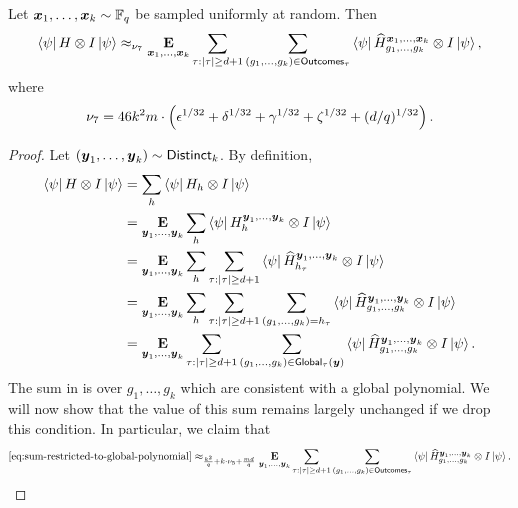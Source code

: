 \begin{lemma}
\label{lem:over-all-outcomes}
Let ${\boldsymbol{x}}_1, \ldots, {\boldsymbol{x}}_k \sim \mathbb F_q$ be sampled uniformly at random.
Then
\begin{equation*}
\bra{\psi} H \otimes I \ket{\psi}
\approx_{\nu_7}  \mathop{\bf E\/}_{{\boldsymbol{x}}_1, \ldots, {\boldsymbol{x}}_k} \sum_{\tau:|\tau| \geq d+1} \sum_{(g_1, \ldots, g_k) \in \mathsf{Outcomes}_{\tau}} \bra{\psi} \widehat{H}^{{\boldsymbol{x}}_1, \ldots, {\boldsymbol{x}}_k}_{g_1, \ldots, g_k} \otimes I \ket{\psi},
\end{equation*}
where
\begin{equation*}
\nu_7 = 46 k^2m \cdot \left(\epsilon^{1/32} + \delta^{1/32} +\gamma^{1/32} +  \zeta^{1/32} + (d/q)^{1/32}\right).
\end{equation*}
\end{lemma}
\begin{proof}
Let $(\boldsymbol{y}_1, \ldots, \boldsymbol{y}_k) \sim \mathsf{Distinct}_k$.
By definition,
\begin{align}
\bra{\psi} H \otimes I \ket{\psi}
&= \sum_h \bra{\psi} H_h \otimes I \ket{\psi}\nonumber\\
&= \mathop{\bf E\/}_{\boldsymbol{y}_1, \ldots, \boldsymbol{y}_k} \sum_h \bra{\psi} H^{\boldsymbol{y}_1, \ldots, \boldsymbol{y}_k}_h \otimes I \ket{\psi}\nonumber\\
&= \mathop{\bf E\/}_{\boldsymbol{y}_1, \ldots, \boldsymbol{y}_k} \sum_h \sum_{\tau:|\tau| \geq d+1} \bra{\psi} \widehat{H}^{\boldsymbol{y}_1, \ldots, \boldsymbol{y}_k}_{h_{\tau}} \otimes I \ket{\psi}\nonumber\\
&= \mathop{\bf E\/}_{\boldsymbol{y}_1, \ldots, \boldsymbol{y}_k} \sum_h \sum_{\tau:|\tau| \geq d+1} \sum_{(g_1, \ldots, g_k) = h_\tau} \bra{\psi} \widehat{H}^{\boldsymbol{y}_1, \ldots, \boldsymbol{y}_k}_{g_1, \ldots, g_k} \otimes I \ket{\psi}\nonumber\\
&= \mathop{\bf E\/}_{\boldsymbol{y}_1, \ldots, \boldsymbol{y}_k}  \sum_{\tau:|\tau| \geq d+1} \sum_{(g_1, \ldots, g_k) \in \mathsf{Global}_{\tau}(\boldsymbol{y})} \bra{\psi} \widehat{H}^{\boldsymbol{y}_1, \ldots, \boldsymbol{y}_k}_{g_1, \ldots, g_k} \otimes I \ket{\psi}. \label{eq:sum-restricted-to-global-polynomial}
\end{align}
The sum in 
is over $g_1, \ldots, g_k$ which are consistent with a global polynomial.
We will now show that the value of this sum
remains largely unchanged if we drop this condition.
In particular, we claim that
\begin{equation}\label{eq:remove-the-restriction}
\eqref{eq:sum-restricted-to-global-polynomial}
\approx_{\frac{k^2}{q} + k \cdot\nu_5 + \frac{md}{q}}
\E_{\by_1, \ldots, \by_k}  \sum_{\tau:|\tau| \geq d+1} \sum_{(g_1, \ldots, g_k) \in \mathsf{Outcomes}_{\tau}} \bra{\psi} \widehat{H}^{\by_1, \ldots, \by_k}_{g_1, \ldots, g_k} \otimes I \ket{\psi}.

\end{equation}
\end{proof}
